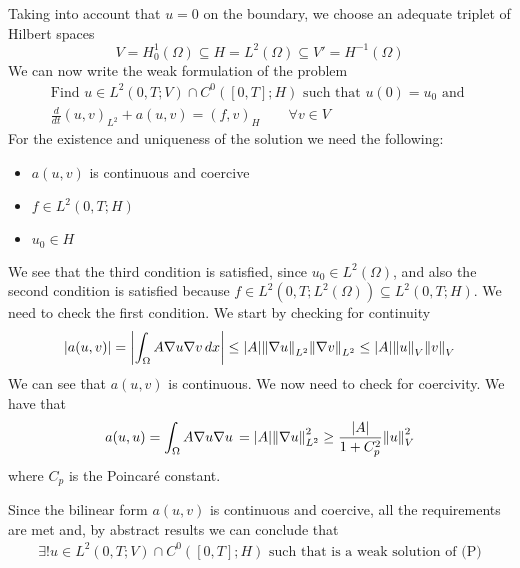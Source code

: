 Taking into account that \(u = 0\) on the boundary, we choose an adequate triplet of Hilbert spaces
\[
    V = H^1_0(\Omega) \subseteq H = L^2(\Omega) \subseteq V' = H^{-1}(\Omega)
\]
We can now write the weak formulation of the problem
\[
    \begin{split}
        \text{Find } u \in L^2(0, T; V) \cap C^0([0, T]; H) \text{ such that } u(0) = u_0 \text{ and }\\
        \frac{d}{dt} (u, v)_{L^2} + a(u, v) = (f, v)_{H} \qquad \forall v \in V
    \end{split}
\]
For the existence and uniqueness of the solution we need the following:
\begin{itemize}
    \item \(a(u, v)\) is continuous and coercive
    \item \(f \in L^2(0, T; H)\)
    \item \(u_0 \in H\)
\end{itemize}
We see that the third condition is satisfied, since \(u_0 \in L^2(\Omega)\), and also the second condition is satisfied because \(f \in L^2(0, T; L^2(\Omega)) \subseteq L^2(0, T; H)\). We need to check the first condition. We start by checking for continuity
\[
    \begin{split}
        \abs{a(u, v)} = \abs{\int_\Omega A \nabla u \nabla v \, dx} \leq \abs{A} \norm{\nabla u}_{L^2} \norm{\nabla v}_{L^2} \leq \abs{A} \norm{u}_{V} \norm{v}_{V} 
    \end{split}
\]
We can see that \(a(u, v)\) is continuous. We now need to check for coercivity. We have that
\[
    \begin{split}
        a(u, u) = \int_\Omega A \nabla u \nabla u \, = \abs{A} \norm{\nabla u}_{L^2}^2 \geq \frac{\abs{A}}{1 + C_p^2} \norm{u}_{V}^2
    \end{split}
\]
where \(C_p\) is the Poincaré constant.

Since the bilinear form \(a(u, v)\) is continuous and coercive, all the requirements are met and, by abstract results we can conclude that
\[
    \begin{split}
        \exists! u \in L^2(0, T; V) \cap C^0([0, T]; H) \text{ such that is a weak solution of (P)}
    \end{split}
\]

